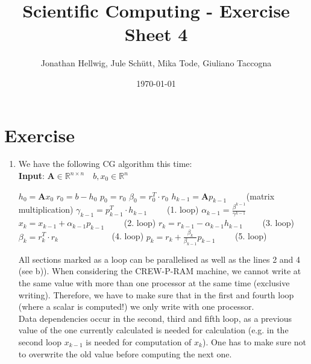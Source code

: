 \documentclass{article}
\title{Scientific Computing - Exercise Sheet 4}
\author{Jonathan Hellwig, Jule Schütt, Mika Tode, Giuliano Taccogna}
\date{\today}
\begin{document}
\maketitle

\section{Exercise}
\begin{enumerate}[label=(\alph*)]
\item We have the following CG algorithm this time:\\

   \textbf{Input}: $ \textbf{A} \in \mathbb{R}^{n\times n} \quad b, x_0\in \mathbb{R}^n$
    \begin{algorithmic}[1]
	\State $h_{0} = \textbf{A}x_{0}$ 
	\State $r_0 = b - h_0$
	\State $p_0 = r_0$
	\State $\beta_0 = r_0^T\cdot r_0$
	\State $h_{k-1} = \textbf{A}p_{k-1}\qquad$ (matrix multiplication)
	\State $\gamma_{k-1} = p^{T}_{k-1}\cdot h_{k-1}\qquad$ (1. loop)
	\State $\alpha_{k-1} = \frac{\beta^{k-1}}{\gamma^{k-1}}$
	\State $x_k = x_{k-1} + \alpha_{k-1}p_{k-1}\qquad$ (2. loop)
	\State $r_k = r_{k-1} - \alpha_{k-1}h_{k-1}\qquad$ (3. loop)
	\State $\beta_k = r_k^T\cdot r_k\qquad \qquad \qquad$ (4. loop)
	\State $p_k = r_{k} + \frac{\beta_k}{\beta_{k-1}}p_{k-1}\qquad$ (5. loop)
	\EndFor
    \end{algorithmic}
All sections marked as a loop can be parallelised as well as the lines 2 and 4 (see b)). When considering the CREW-P-RAM machine, we cannot write at the same value with more than one processor at the same time (exclusive writing). Therefore, we have to make sure that in the first and fourth loop (where a scalar is computed!) we only write with one processor.\\
Data dependencies occur in the second, third and fifth loop, as a previous value of the one currently calculated is needed for calculation (e.g. in the second loop $x_{k-1}$ is needed for computation of $x_k$). One has to make sure not to overwrite the old value before computing the next one.



\end{enumerate}
\end{document}
